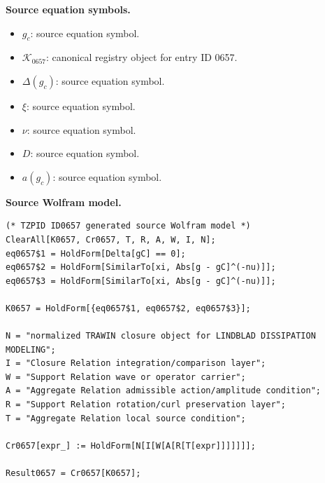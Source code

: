 \begin{minipage}[t]{0.49\linewidth}
\begingroup
\small
\raggedright
\textbf{Source equation symbols.}\par
\begin{itemize}[leftmargin=1.35em,itemsep=1pt,topsep=1pt,parsep=0pt]
    \item $g_c$: source equation symbol.
    \item $\mathcal{K}_{0657}$: canonical registry object for entry ID 0657.
    \item $\Delta(g_c)$: source equation symbol.
    \item $\xi$: source equation symbol.
    \item $\nu$: source equation symbol.
    \item $D$: source equation symbol.
    \item $a(g_c)$: source equation symbol.
\end{itemize}
\endgroup
\end{minipage}\hfill
\begin{minipage}[t]{0.47\linewidth}
\begingroup
\scriptsize
\raggedright
\textbf{Source Wolfram model.}\par
\begin{Verbatim}[fontsize=\tiny,breaklines=true,breakanywhere=true]
(* TZPID ID0657 generated source Wolfram model *)
ClearAll[K0657, Cr0657, T, R, A, W, I, N];
eq0657$1 = HoldForm[Delta[gC] == 0];
eq0657$2 = HoldForm[SimilarTo[xi, Abs[g - gC]^(-nu)]];
eq0657$3 = HoldForm[SimilarTo[xi, Abs[g - gC]^(-nu)]];

K0657 = HoldForm[{eq0657$1, eq0657$2, eq0657$3}];

N = "normalized TRAWIN closure object for LINDBLAD DISSIPATION MODELING";
I = "Closure Relation integration/comparison layer";
W = "Support Relation wave or operator carrier";
A = "Aggregate Relation admissible action/amplitude condition";
R = "Support Relation rotation/curl preservation layer";
T = "Aggregate Relation local source condition";

Cr0657[expr_] := HoldForm[N[I[W[A[R[T[expr]]]]]]];

Result0657 = Cr0657[K0657];
\end{Verbatim}
\endgroup
\end{minipage}

